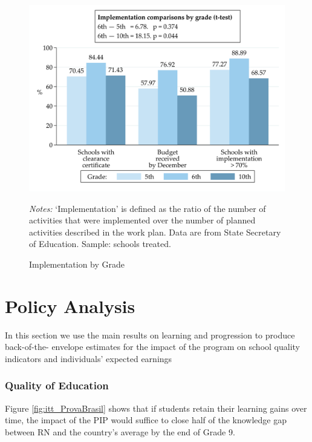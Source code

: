 \documentclass[11pt,a4paper]{article}
\begin{document}
\begin{figure}[ht!]
    \caption{Implementation by Grade}
    \label{fig:implementation_byGrade}
    \centering
    \includegraphics[width=14cm]{DataWork/Output/Figures/fig6-implementation_byGrade.png}
    \begin{minipage}{0.825\textwidth}
        \small{\textit{Notes:} `Implementation' is defined as the ratio of the number of activities that were implemented over the number of planned activities described in the work plan. Data are from State Secretary of Education. Sample: schools treated.}
    \end{minipage}
\end{figure}
\FloatBarrier

\clearpage

\section{Policy Analysis} \label{sec:policy}

In this section we use the main results on learning and progression to produce back-of-the- envelope estimates for the impact of the program on school quality indicators and individuals' expected earnings

\subsubsection*{Quality of Education} 

Figure \ref{fig:itt_ProvaBrasil} shows that if students retain their learning gains over time, the impact of the PIP would suffice to close half of the knowledge gap between RN and the country's average by the end of Grade 9. 
\end{document}
